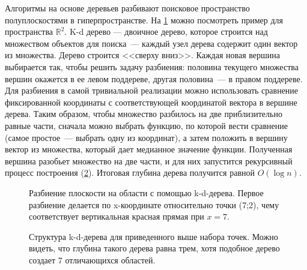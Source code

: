 \documentclass[a4paper,12pt]{extarticle}
\begin{document}
Алгоритмы на основе деревьев \cite{enwiki:1089227535} разбивают поисковое пространство полуплоскостями в гиперпространстве. На \cref{ris:kdplane} можно посмотреть пример для пространства $\mathbb{R}^2$. K-d дерево --- двоичное дерево, которое строится над множеством объектов для поиска~--- каждый узел дерева содержит один вектор из множества. Дерево строится <<сверху вниз>>. Каждая новая вершина выбирается так, чтобы решить задачу разбиения: половина текущего множества вершин окажется в ее левом поддереве, другая половина~--- в правом поддереве. Для разбиения в самой тривиальной реализации можно использовать сравнение фиксированной координаты с соответствующей координатой вектора в вершине дерева. Таким образом, чтобы множество разбилось на две приблизительно равные части, сначала можно выбрать функцию, по которой вести сравнение (самое простое~--- выбрать одну из координат), а затем положить в вершину вектор из множества, который дает медианное значение функции. Полученная вершина разобьет множество на две части, и для них запустится рекурсивный процесс построения (\cref{ris:kdtree}). Итоговая глубина дерева получится равной $O(\log n)$.

\begin{center}
\begin{figure}[H]
\caption{Разбиение плоскости на области с помощью k-d-дерева. Первое разбиение делается по x-координате относительно точки (7;2), чему соответствует вертикальная красная прямая при $x=7$.}
\label{ris:kdplane}
\end{figure}
\begin{figure}[H]
\caption{Структура k-d-дерева для приведенного выше набора точек. Можно видеть, что глубина такого дерева равна трем, хотя подобное дерево создает 7 отличающихся областей.}
\label{ris:kdtree}
\end{figure}
\end{center}
\end{document}
